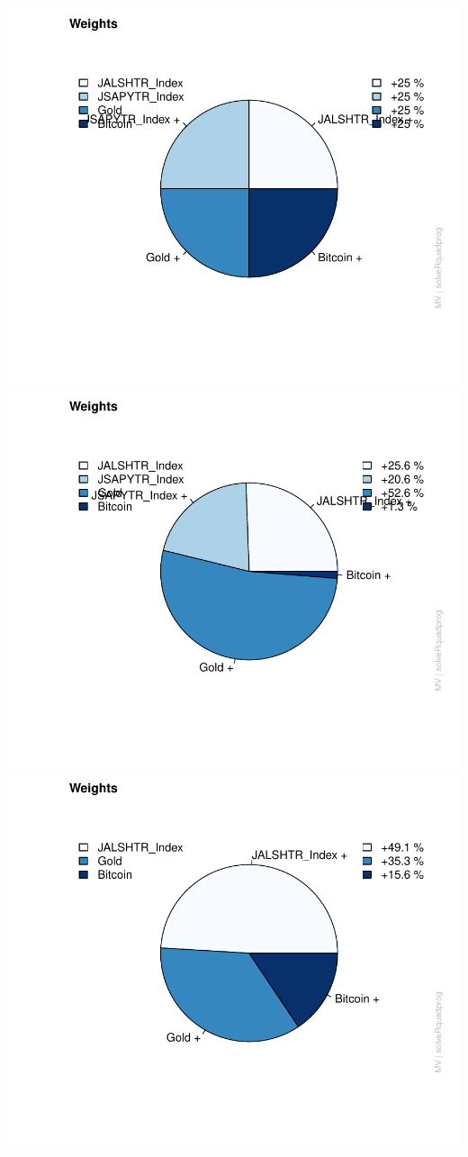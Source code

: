 \documentclass[11pt,preprint, authoryear]{elsarticle}
\numberwithin{equation}{section}
\numberwithin{figure}{section}
\numberwithin{table}{section}
\begin{document}
\includegraphics{FinMetrics-Essay_files/figure-latex/unnamed-chunk-12-1.pdf}
\includegraphics{FinMetrics-Essay_files/figure-latex/unnamed-chunk-12-2.pdf}
\includegraphics{FinMetrics-Essay_files/figure-latex/unnamed-chunk-12-3.pdf}
\end{document}
